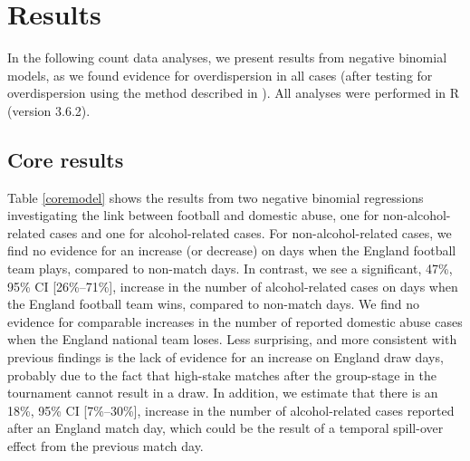 \documentclass[12pt, a4paper]{article}
\begin{document}
\newpage

\section{Results}

In the following count data analyses, we present results from negative binomial models, as we found evidence for overdispersion in all cases (after testing for overdispersion using the method described in ). All analyses were performed in R (version 3.6.2).


\subsection{Core results} 

Table \ref{coremodel} shows the results from two negative binomial regressions investigating the link between football and domestic abuse, one for non-alcohol-related cases and one for alcohol-related cases. For non-alcohol-related cases, we find no evidence for an increase (or decrease) on days when the England football team plays, compared to non-match days. In contrast, we see a significant, 47\%, 95\% CI [26\%--71\%], increase in the number of alcohol-related cases on days when the England football team wins, compared to non-match days. We find no evidence for comparable increases in the number of reported domestic abuse cases when the England national team loses. Less surprising, and more consistent with previous findings is the lack of evidence for an increase on England draw days, probably due to the fact that high-stake matches after the group-stage in the tournament cannot result in a draw. In addition, we estimate that there is an 18\%, 95\% CI [7\%--30\%], increase in the number of alcohol-related cases reported after an England match day, which could be the result of a temporal spill-over effect from the previous match day. 
\end{document}
